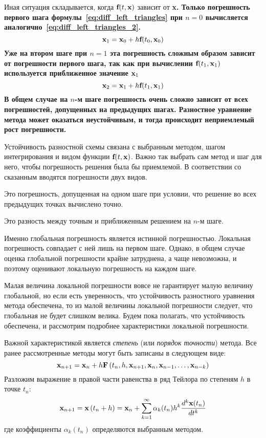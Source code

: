 Иная ситуация складывается, когда $\bf{f}(t, \bf{x})$ зависит от \bf{x}. Только погрешность первого шага формулы~\eqref{eq:diff_left_triangles}
при $n = 0$ вычисляется аналогично~\eqref{eq:diff_left_triangles_2}.
\begin{equation*}
    \bf{x}_1 = \bf{x}_0 + h\bf{f}(t_0, \bf{x}_0)
\end{equation*}
Уже на втором шаге при $n = 1$ эта погрешность сложным образом зависит от погрешности первого шага, так как при
вычислении $\bf{f}(t_1, \bf{x}_1)$ используется приближенное значение $\bf{x}_1$
\begin{equation*}
    \bf{x}_2 = \bf{x}_1 + h\bf{f}(t_1, \bf{x}_1)
\end{equation*}
В общем случае на $n$-м шаге погрешность очень сложно зависит от всех погрешностей, допущенных на предыдущих шагах.
Разностное уравнение метода может оказаться неустойчивым, и тогда происходит неприемлемый рост погрешности.

Устойчивость разностной схемы связана с выбранным методом, шагом интегрирования и видом функции $\bf{f}(t, \bf{x})$.
Важно так выбрать сам метод и шаг для него, чтобы погрешность решения была бы приемлемой. В соответствии со сказанным
вводятся погрешности двух видов.
\begin{definition}
    Это погрешность, допущенная на одном шаге при условии, что решение во всех предыдущих точках вычислено точно.
\end{definition}
\begin{definition}
    Это разность между точным и приближенным решением на $n$-м шаге.
\end{definition}
Именно глобальная погрешность является истинной погрешностью. Локальная погрешность совпадает с ней лишь на первом
шаге. Однако, в общем случае оценка глобальной погрешности крайне затруднена, а чаще невозможна, и поэтому оценивают
локальную погрешность на каждом шаге.

Малая величина локальной погрешности вовсе не гарантирует малую величину глобальной, но если есть уверенность, что
устойчивость разностного уравнения метода обеспечена, то из малой величины локальной погрешности следует, что
глобальная не будет слишком велика. Будем пока полагать, что устойчивость обеспечена, и рассмотрим подробнее
характеристики локальной погрешности.

Важной характеристикой является \emph{степень} (или \emph{порядок точности}) метода. Все ранее рассмотренные методы
могут быть записаны в следующем виде:
\begin{equation}
    \bf{x}_{n+1} = \bf{x}_n + h\bf{F}\left( t_n, h, \bf{x}_{n+1}, \bf{x}_n, \bf{x}_{n-1}, \ldots, \bf{x}_{n - k} \right) \label{eq:diff_common_method_form}
\end{equation}
Разложим выражение в правой части равенства в ряд Тейлора по степеням $h$ в точке $t_n$:
\begin{equation}
    \bf{x}_{n+1} = \bf{x}\left( t_n + h \right) = \bf{x}_n + \sum_{k=1}^{\infty} \alpha_k(t_n) h^k \frac{d^k \bf{x}(t_n)}{dt^k} \label{eq:dcmf_taylor}
\end{equation}
где коэффициенты $\alpha_k(t_n)$ определяются выбранным методом.

